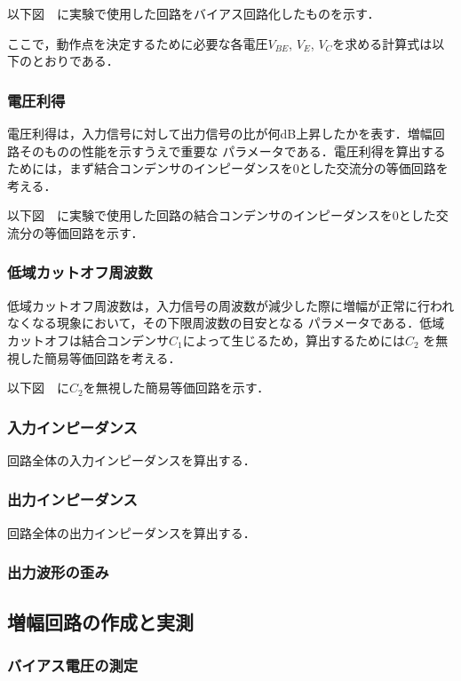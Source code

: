 \documentclass[dvipdfmx,titlepage,a4j]{jsarticle}  %
\begin{document}
以下図　に実験で使用した回路をバイアス回路化したものを示す．

ここで，動作点を決定するために必要な各電圧$V_{BE}$, $V_{E}$, $V_{C}$を求める計算式は以下のとおりである．

\subsubsection{電圧利得}
電圧利得は，入力信号に対して出力信号の比が何dB上昇したかを表す．増幅回路そのものの性能を示すうえで重要な
パラメータである．電圧利得を算出するためには，まず結合コンデンサのインピーダンスを0とした交流分の等価回路を考える．

以下図　に実験で使用した回路の結合コンデンサのインピーダンスを0とした交流分の等価回路を示す．

\subsubsection{低域カットオフ周波数}
低域カットオフ周波数は，入力信号の周波数が減少した際に増幅が正常に行われなくなる現象において，その下限周波数の目安となる
パラメータである．低域カットオフは結合コンデンサ$C_1$によって生じるため，算出するためには$C_2$
を無視した簡易等価回路を考える．

以下図　に$C_2$を無視した簡易等価回路を示す．

\subsubsection{入力インピーダンス}
回路全体の入力インピーダンスを算出する．


\subsubsection{出力インピーダンス}
回路全体の出力インピーダンスを算出する．

\subsubsection{出力波形の歪み}

\subsection{増幅回路の作成と実測}

\subsubsection{バイアス電圧の測定}
\end{document}

